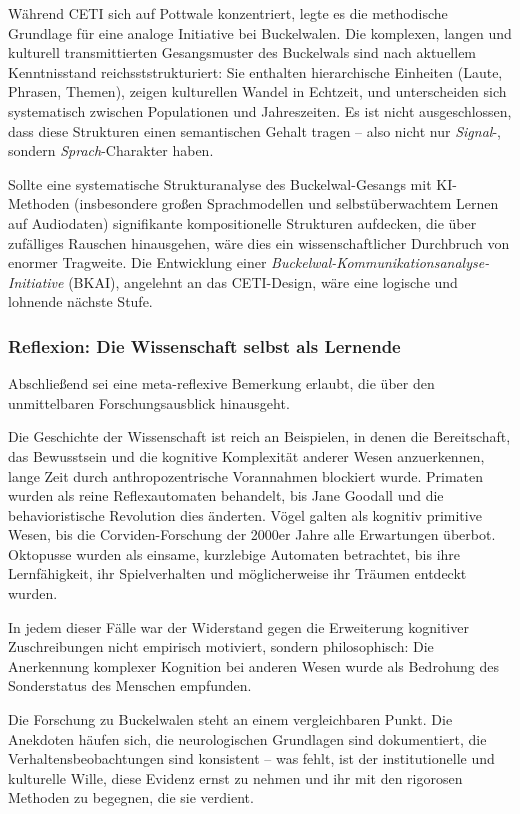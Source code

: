 ﻿\documentclass[12pt,a4paper]{article}
\theoremstyle{definition}
\theoremstyle{remark}
\begin{document}
Während CETI sich auf Pottwale konzentriert, legte es die methodische Grundlage für eine analoge Initiative bei Buckelwalen. Die komplexen, langen und kulturell transmittierten Gesangsmuster des Buckelwals sind nach aktuellem Kenntnisstand reichsststrukturiert: Sie enthalten hierarchische Einheiten (Laute, Phrasen, Themen), zeigen kulturellen Wandel in Echtzeit, und unterscheiden sich systematisch zwischen Populationen und Jahreszeiten. Es ist nicht ausgeschlossen, dass diese Strukturen einen semantischen Gehalt tragen -- also nicht nur \emph{Signal}-, sondern \emph{Sprach}-Charakter haben.

Sollte eine systematische Strukturanalyse des Buckelwal-Gesangs mit KI-Methoden (insbesondere großen Sprachmodellen und selbstüberwachtem Lernen auf Audiodaten) signifikante kompositionelle Strukturen aufdecken, die über zufälliges Rauschen hinausgehen, wäre dies ein wissenschaftlicher Durchbruch von enormer Tragweite. Die Entwicklung einer \emph{Buckelwal-Kommunikationsanalyse-Initiative} (BKAI), angelehnt an das CETI-Design, wäre eine logische und lohnende nächste Stufe.

\subsubsection{Reflexion: Die Wissenschaft selbst als Lernende}

Abschließend sei eine meta-reflexive Bemerkung erlaubt, die über den unmittelbaren Forschungsausblick hinausgeht.

Die Geschichte der Wissenschaft ist reich an Beispielen, in denen die Bereitschaft, das Bewusstsein und die kognitive Komplexität anderer Wesen anzuerkennen, lange Zeit durch anthropozentrische Vorannahmen blockiert wurde. Primaten wurden als reine Reflexautomaten behandelt, bis Jane Goodall und die behavioristische Revolution dies änderten. Vögel galten als kognitiv primitive Wesen, bis die Corviden-Forschung der 2000er Jahre alle Erwartungen überbot. Oktopusse wurden als einsame, kurzlebige Automaten betrachtet, bis ihre Lernfähigkeit, ihr Spielverhalten und möglicherweise ihr Träumen entdeckt wurden.

In jedem dieser Fälle war der Widerstand gegen die Erweiterung kognitiver Zuschreibungen nicht empirisch motiviert, sondern philosophisch: Die Anerkennung komplexer Kognition bei anderen Wesen wurde als Bedrohung des Sonderstatus des Menschen empfunden.

Die Forschung zu Buckelwalen steht an einem vergleichbaren Punkt. Die Anekdoten häufen sich, die neurologischen Grundlagen sind dokumentiert, die Verhaltensbeobachtungen sind konsistent -- was fehlt, ist der institutionelle und kulturelle Wille, diese Evidenz ernst zu nehmen und ihr mit den rigorosen Methoden zu begegnen, die sie verdient.
\end{document}
